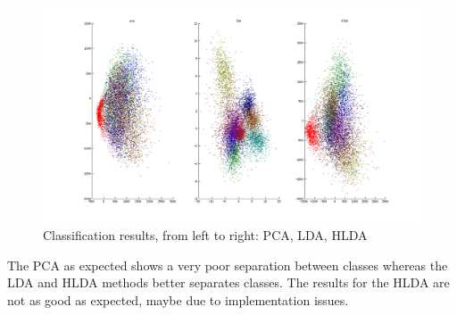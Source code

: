 \begin{center}
\begin{figure}[H!]
  \includegraphics[scale=0.30]{img/classif}
  \caption{Classification results, from left to right: PCA, LDA, HLDA}
  \label{img:classif}
\end{figure}
\end{center}

The PCA as expected shows a very poor separation between classes whereas the LDA and HLDA
methods better separates classes. The results for the HLDA are not as good as expected,
maybe due to implementation issues.
